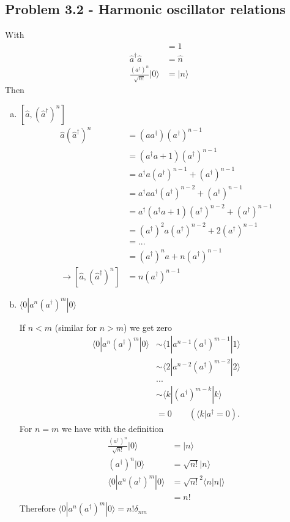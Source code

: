 \documentclass[10pt,a4paper]{book}
\theoremstyle{definition}
\begin{document}
\subsection{Problem 3.2 - Harmonic oscillator relations}
With
\begin{align}
[\hat{a},\hat{a}^\dagger]&=1\\
\hat{a}^\dagger\hat{a}&=\hat{n}\\
\frac{(a^\dagger)^n}{\sqrt{n!}}|0\rangle&=|n\rangle
\end{align}
Then
\begin{enumerate}[(a)]
\item $[\hat{a},(\hat{a}^\dagger)^n]$
\begin{align}
\hat{a}(\hat{a}^\dagger)^n
&=(a a^\dagger)(a^\dagger)^{n-1}\\
&=(a^\dagger a+1)(a^\dagger)^{n-1}\\
&=a^\dagger a(a^\dagger)^{n-1}+(a^\dagger)^{n-1}\\
&=a^\dagger aa^\dagger(a^\dagger)^{n-2}+(a^\dagger)^{n-1}\\
&=a^\dagger (a^\dagger a+1)(a^\dagger)^{n-2}+(a^\dagger)^{n-1}\\
&=(a^\dagger)^2 a(a^\dagger)^{n-2}+2(a^\dagger)^{n-1}\\
&=...\\
&=(a^\dagger)^{n}a+n(a^\dagger)^{n-1}\\
\rightarrow[\hat{a},(\hat{a}^\dagger)^n]&=n(a^\dagger)^{n-1}
\end{align}

\item $\langle0|a^n(a^\dagger)^m|0\rangle$

If $n<m$ (similar for $n>m$) we get zero 
\begin{align}
\langle0|a^n(a^\dagger)^m|0\rangle
&\sim\langle1|a^{n-1}(a^\dagger)^{m-1}|1\rangle\\
&\sim\langle2|a^{n-2}(a^\dagger)^{m-2}|2\rangle\\
&...\\
&\sim\langle k|(a^\dagger)^{m-k}|k\rangle\\
&=0\qquad (\langle k|a^\dagger=0).
\end{align}
For $n=m$ we have with the definition
\begin{align}
\frac{(a^\dagger)^n}{\sqrt{n!}}|0\rangle&=|n\rangle\\
(a^\dagger)^n|0\rangle&=\sqrt{n!}|n\rangle\\
\langle0|a^n(a^\dagger)^m|0\rangle&=\sqrt{n!}^2\langle n|n|\rangle\\
&=n!
\end{align}
Therefore  $\langle0|a^n(a^\dagger)^m|0\rangle=n!\delta_{nm}$


\end{enumerate}
\end{document}
